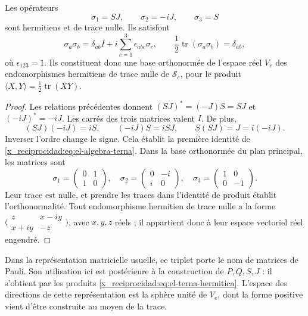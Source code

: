 \begin{proposition}
\label{x_reciprocidad:prop:el-terna-hermitica}
Les opérateurs
\begin{equation}
 \sigma_1=SJ,\qquad \sigma_2=-iJ,\qquad \sigma_3=S
 \label{x_reciprocidad:eq:el-terna-hermitica}
\end{equation}
sont hermitiens et de trace nulle. Ils satisfont
\begin{equation}
 \sigma_a\sigma_b
 =\delta_{ab}I+i\sum_{c=1}^3\epsilon_{abc}\sigma_c,
 \qquad
 \frac12\operatorname{tr}(\sigma_a\sigma_b)=\delta_{ab},
 \label{x_reciprocidad:eq:el-algebra-terna}
\end{equation}
où \(\epsilon_{123}=1\). Ils constituent donc une base orthonormée
de l'espace réel \(V_e\) des endomorphismes hermitiens de trace nulle de
\(\mathscr S_e\), pour le produit
\(\langle X,Y\rangle=\frac12\operatorname{tr}(XY)\).
\end{proposition}
\begin{proof}
Les relations précédentes donnent \((SJ)^*=(-J)S=SJ\) et
\((-iJ)^*=-iJ\). Les carrés des trois matrices valent \(I\).
De plus,
\[
 (SJ)(-iJ)=iS,\qquad (-iJ)S=iSJ,\qquad S(SJ)=J=i(-iJ).
\]
Inverser l'ordre change le signe. Cela établit la première identité
de \eqref{x_reciprocidad:eq:el-algebra-terna}. Dans la base orthonormée du plan principal,
les matrices sont
\[
 \sigma_1=\begin{pmatrix}0&1\\1&0\end{pmatrix},\quad
 \sigma_2=\begin{pmatrix}0&-i\\i&0\end{pmatrix},\quad
 \sigma_3=\begin{pmatrix}1&0\\0&-1\end{pmatrix}.
\]
Leur trace est nulle, et prendre les traces dans l'identité de produit établit
l'orthonormalité. Tout endomorphisme hermitien de trace nulle a la forme
\(\bigl(\begin{smallmatrix}z&x-iy\\x+iy&-z\end{smallmatrix}\bigr)\),
avec \(x,y,z\) réels ; il appartient donc à leur espace vectoriel réel engendré.
\end{proof}

Dans la représentation matricielle usuelle, ce triplet porte le nom de
matrices de Pauli. Son utilisation ici est postérieure à la construction de
\(P,Q,S,J\) : il s'obtient par les produits
\eqref{x_reciprocidad:eq:el-terna-hermitica}. L'espace des directions de cette
représentation est la sphère unité de \(V_e\), dont la forme positive
vient d'être construite au moyen de la trace.

